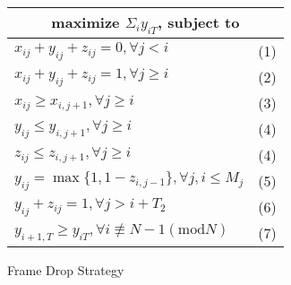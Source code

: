 \begin{figure}[tb]
\centering
{\setlength{\tabcolsep}{3pt}
\begin{tabular}{|l|l|}
\hline
\multicolumn{2}{|c|}{ maximize $\Sigma_i y_{iT}$, subject to} \\ \hline \hline
 $x_{ij}+y_{ij}+z_{ij} = 0, \forall j<i$       & (1)        \\
 $x_{ij}+y_{ij}+z_{ij} = 1, \forall j\geq i$   & (2)       \\
 $x_{ij} \geq x_{i,j+1}, \forall j\geq i$      & (3)        \\
 $y_{ij} \leq y_{i,j+1}, \forall j\geq i$      & (4)        \\
 $z_{ij} \leq z_{i,j+1}, \forall j\geq i$      & (4)        \\ \hline
 $y_{ij} = \max\{1,{1-z_{i,j-1}}\}, \forall j, i \leq M_{j}$  & (5)   \\ \hline
 $y_{ij}+z_{ij} = 1 ,\forall j>i+T_2$          & (6)        \\ \hline
 $y_{i+1,T} \geq y_{iT}, \forall i \not\equiv N-1 (\text{mod}N)$ &(7) \\ \hline
\end{tabular}}
\caption{Frame Drop Strategy}
\label{fig:ip-program} 
\end{figure}
